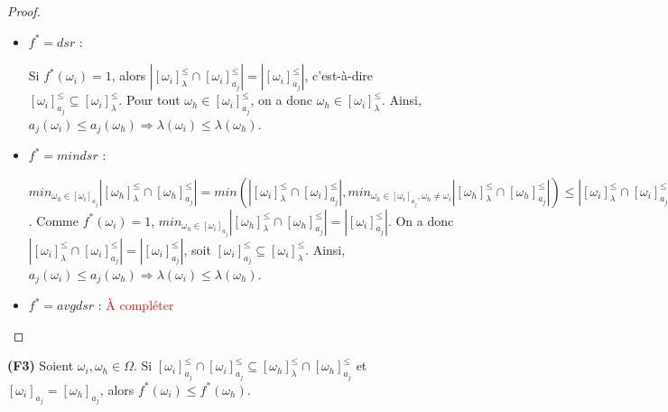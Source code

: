 \documentclass[a4paper]{article}
\begin{document}
\begin{proof}
\begin{itemize}
    \item $f^* = dsr$ :

Si $f^*(\omega_i) = 1 $, alors $|[\omega_i]^{\leq}_{\lambda} \cap
        [\omega_i]^{\leq}_{a_j}| = |[\omega_i]^{\leq}_{a_j}|$, c'est-à-dire
        $[\omega_i]^{\leq}_{a_j} \subseteq [\omega_i]^{\leq}_{\lambda}$. Pour
        tout $\omega_h \in [\omega_i]^{\leq}_{a_j}$, on a donc $\omega_h \in
        [\omega_i]^{\leq}_{\lambda}$. Ainsi, $a_j(\omega_i) \leq a_j(\omega_h)
        \Rightarrow \lambda(\omega_i) \leq \lambda(\omega_h)$. \\
    
    \item $f^* = mindsr$ : 

        $min_{\omega_h \in [\omega_i]_{a_j}}|[\omega_h]^{\leq}_{\lambda} \cap
        [\omega_h]^{\leq}_{a_j}| = min(|[\omega_i]^{\leq}_{\lambda} \cap
        [\omega_i]^{\leq}_{a_j}|, min_{\omega_h \in [\omega_i]_{a_j}, \omega_h
        \neq \omega_i}|[\omega_h]^{\leq}_{\lambda} \cap
        [\omega_h]^{\leq}_{a_j}|) \leq |[\omega_i]^{\leq}_{\lambda} \cap
        [\omega_i]^{\leq}_{a_j}| \leq |[\omega_i]^{\leq}_{a_j}|$. 
        Comme $f^*(\omega_i) = 1$, $min_{\omega_h \in [\omega_i]_{a_j}}
        |[\omega_h]^{\leq}_{\lambda} \cap [\omega_h]^{\leq}_{a_j}| =
        |[\omega_i]^{\leq}_{a_j}|$. On a donc $|[\omega_i]^{\leq}_{\lambda}
        \cap [\omega_i]^{\leq}_{a_j}| = |[\omega_i]^{\leq}_{a_j}|$, soit
        $[\omega_i]^{\leq}_{a_j} \subseteq [\omega_i]^{\leq}_{\lambda}$. Ainsi,
        $a_j(\omega_i) \leq a_j(\omega_h) \Rightarrow \lambda(\omega_i) \leq
        \lambda(\omega_h)$.\\

    \item $f^* = avgdsr$ : \textcolor{red}{À compléter} \\%
\end{itemize}
\end{proof}

\textbf{(F3)} Soient $\omega_i, \omega_h \in \Omega$. Si $[\omega_i]^{\leq}_{a_j} \cap
[\omega_i]^{\leq}_{a_j} \subseteq [\omega_h]^{\leq}_{\lambda} \cap
[\omega_h]^{\leq}_{a_j}$ et $[\omega_i]_{a_j} = [\omega_h]_{a_j}$, alors
$f^*(\omega_i) \leq f^*(\omega_h)$.
\end{document}
